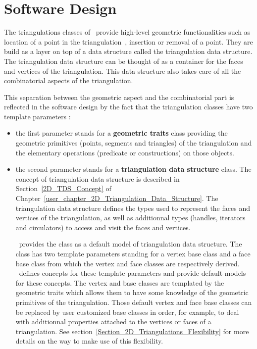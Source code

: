 \section{Software Design}
\label{Section_2D_Triangulations_Software_Design}

The triangulations  classes of \cgal\  
provide high-level geometric functionalities
such as location of a point in the triangulation~\cite{dpt-wt-02}, insertion
or removal of a point.
They are build as a layer on top of a data structure
called the triangulation data structure.
The triangulation data structure   can be thought 
of as a container for the faces and vertices of the triangulation.
This data structure  also takes care
of all the combinatorial aspects of the triangulation.

This separation between the
geometric aspect and the combinatorial part
is reflected in the software design by the fact
that the triangulation classes have two template parameters :

\begin{itemize}
\item {} the first parameter stands for a
\textbf{geometric traits} class providing 
the geometric primitives (points, segments and triangles) 
of  the triangulation and the elementary
operations (predicate or constructions) on those objects.

\item {} the second parameter stands for a
\textbf{triangulation data structure} class. The concept
of triangulation data structure is described in
 Section~\ref{2D_TDS_Concept} of
Chapter~\ref{user_chapter_2D_Triangulation_Data_Structure}.
The triangulation data structure defines the types
used to represent the faces and vertices of the triangulation,
as well as additionnal types (handles, iterators and circulators)
to access and visit the faces and vertices.

\cgal\ provides the class 
as a  default model of triangulation data structure.
The class \ccc{Triangulation_data_structure_2<Vb,Fb>}
has two template parameters standing for
a vertex base class and a face base class from which the vertex and
face classes are respectively derived.
\cgal\ defines concepts 
for these template parameters
and provide default models for these concepts.
The vertex and base classes are templated by the geometric
traits which allows them to have some knowledge of the geometric
primitives of the triangulation. 
Those default vertex and  face base classes
can be replaced by 
user customized base classes in order, for example, to deal
with additionnal properties attached to the vertices or faces
of a triangulation. See section~\ref{Section_2D_Triangulations_Flexibility}
for more details on the way to make use of this flexibility.
\end{itemize}


